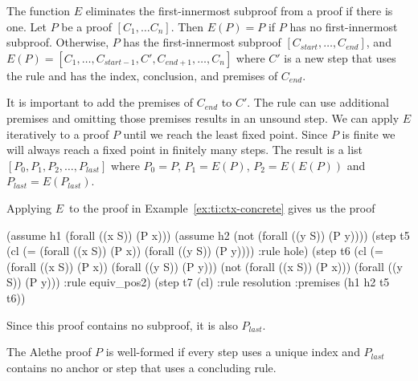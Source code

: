 \documentclass{scrartcl}
\begin{document}
\begin{definition}
The function $E$ eliminates the first-innermost subproof from a proof
if there is one.
Let $P$ be a proof $[C_1, \dots C_n]$.
Then $E(P) = P$ if $P$ has no first-innermost subproof.
Otherwise, $P$ has the first-innermost subproof
$[C_{\mathit{start}}, \dots, C_{\mathit{end}}]$, and
$E(P) = [C_1, \dots, C_{\mathit{start}-1}, C', C_{\mathit{end}+1},
\dots, C_n]$ where $C'$ is a new step that uses the  rule
and has the index, conclusion, and premises of $C_{\mathit{end}}$.
\end{definition}

It is important to add the premises of $C_{\mathit{end}}$
to $C'$.  The  rule can use additional premises
and omitting those premises results in an unsound step.
We can apply $E$ iteratively to a proof $P$ until we reach the least fixed point.
Since $P$ is finite we will always reach a fixed point in finitely many steps.
The result is a list $[P_0, P_1, P_2, \dots, P_{\mathit{last}}]$ where $P_0 = P$,
$P_1 = E(P)$, $P_2 = E(E(P))$ and $P_{\mathit{last}} = E(P_{\mathit{last}})$.

\begin{example}
Applying $E$\, to the proof in
Example~\ref{ex:ti:ctx-concrete} gives us the proof

\begin{AletheVerb}
(assume h1 (forall ((x S)) (P x)))
(assume h2 (not (forall ((y S)) (P y))))
(step t5 (cl (= (forall ((x S)) (P x)) (forall ((y S)) (P y))))
                                      :rule hole)
(step t6 (cl (= (forall ((x S)) (P x)) (forall ((y S)) (P y)))
             (not (forall ((x S)) (P x)))
             (forall ((y S)) (P y))) :rule equiv_pos2)
(step t7 (cl) :rule resolution :premises (h1 h2 t5 t6))
\end{AletheVerb}

Since this proof contains no subproof, it is also $P_{\mathit{last}}$.
\end{example}


\begin{definition}
  \label{def:well_formed_proof}
  The Alethe proof $P$ is well-formed
  if every step uses a unique index and $P_{\mathit{last}}$
  contains no anchor or step that uses a concluding rule.
\end{definition}
\end{document}
